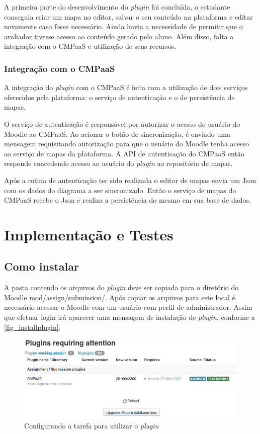 \documentclass[
	12pt,				%
	openright,			%
	oneside,			%
	a4paper,			%
	english,			%
	french,				%
	spanish,			%
	brazil				%
	]{abntex2}
\begin{document}
A primeira parte do desenvolvimento do \textit{plugin} foi concluída, o estudante conseguia criar um mapa no editor, salvar o seu conteúdo na plataforma e editar novamente caso fosse necessário. Ainda havia a necessidade de permitir que o avaliador tivesse acesso ao conteúdo gerado pelo aluno. Além disso, falta a integração com o CMPaaS e utilização de seus recursos.

\subsection{Integração com o CMPaaS}

A integração do \textit{plugin} com o CMPaaS é feita com a utilização de dois serviços oferecidos pela plataforma: o serviço de autenticação e o de persistência de mapas.

O serviço de autenticação é responsável por autorizar o acesso do usuário do Moodle ao CMPaaS. Ao acionar o botão de sincronização, é enviado uma mensagem requisitando autorização para que o usuário do Moodle tenha acesso ao serviço de mapas da plataforma. A API de autenticação do CMPaaS então responde concedendo acesso ao usuário do \textit{plugin} ao repositório de mapas.

Após a rotina de autenticação ter sido realizada o editor de mapas envia um Json com os dados do diagrama a ser sincronizado. Então o serviço de mapas do CMPaaS recebe o Json e realiza a persistência do mesmo em sua base de dados.



\chapter{Implementação e Testes}

\section{Como instalar}
A pasta contendo os arquivos do \textit{plugin} deve ser copiada para o diretório do Moodle mod/assign/submission/. Após copiar os arquivos para este local é necessário acessar o Moodle com um usuário com perfil de administrador. Assim que efetuar login irá aparecer uma mensagem de instalação de \textit{plugin}, conforme a \autoref{fig_installplugin}.
\begin{figure}[htb]
	\caption{\label{fig_installplugin} Configurando a tarefa para utilizar o \textit{plugin}}
	\begin{center}
		\includegraphics[scale=0.4]{installplugin.png}
	\end{center}
\end{figure}
\end{document}
